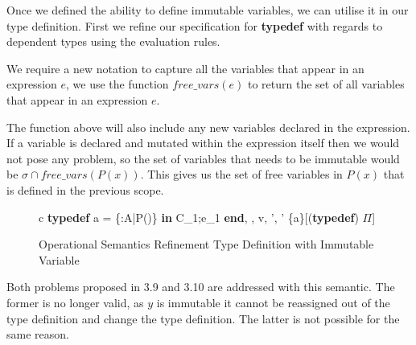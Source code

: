 \documentclass[a4paper,12pt]{report}
\begin{document}
\par
Once we defined the ability to define immutable variables, we can utilise it in 
our type definition. First we refine our specification for \textbf{typedef} 
with regards to dependent types using the evaluation rules.

\par
We require a new notation to capture all the variables that appear in an 
expression $e$, we use the function $free\_vars(e)$ to return the set of all 
variables that appear in an expression $e$.

\par
The function above will also include any new variables declared in the expression. 
If a variable is declared and mutated within the expression itself then we would 
not pose any problem, so the set of variables that needs to be immutable would 
be $\sigma \cap free\_vars(P(x))$. This gives us the set of free variables in $P(x)$ 
that is defined in the previous scope. 

\begin{figure}[H]
  \begin{center}
    \begin{tabular}{c}
      {\langle \textbf{typedef } a = \{\upsilon :A\text{ }|\text{ }P(\upsilon)\} \textbf{ in }C_1;e_1\textbf{ end}, 
      \sigma, \tau \rangle \Longrightarrow 
        \langle v, \sigma', \tau' \setminus \{a\}\rangle}[(\textbf{typedef}) $\Pi$]
    \end{tabular}
  \end{center}
  \caption{Operational Semantics Refinement Type Definition with Immutable Variable}
\end{figure}

\par
Both problems proposed in 3.9 and 3.10 are addressed with this semantic. The 
former is no longer valid, as $y$ is immutable it cannot be reassigned out of 
the type definition and change the type definition. The latter is not possible 
for the same reason.
\end{document}
